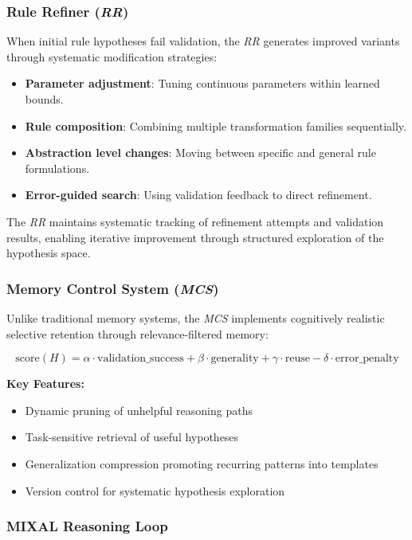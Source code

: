 \documentclass[12pt]{article}
\newcommand{\mcs}{\textit{MCS}}
\newcommand{\rr}{\textit{RR}}
\begin{document}
\subsubsection{Rule Refiner (\rr{})}

When initial rule hypotheses fail validation, the \rr{} generates improved variants through systematic modification strategies:
\begin{itemize}[noitemsep,topsep=0pt]
\item\textbf{Parameter adjustment}: Tuning continuous parameters within learned bounds.
\item\textbf{Rule composition}: Combining multiple transformation families sequentially.
\item\textbf{Abstraction level changes}: Moving between specific and general rule formulations.
\item\textbf{Error-guided search}: Using validation feedback to direct refinement.
\end{itemize}

The \rr{} maintains systematic tracking of refinement attempts and validation results, enabling iterative improvement through structured exploration of the hypothesis space.

\subsubsection{Memory Control System (\mcs{})}

Unlike traditional memory systems, the \mcs{} implements cognitively realistic selective retention through relevance-filtered memory:

$$\text{score}(H) = \alpha \cdot \text{validation\_success} + \beta \cdot \text{generality} + \gamma \cdot \text{reuse} - \delta \cdot \text{error\_penalty}$$

\textbf{Key Features:}
\begin{itemize}[noitemsep,topsep=0pt]
\item Dynamic pruning of unhelpful reasoning paths
\item Task-sensitive retrieval of useful hypotheses
\item Generalization compression promoting recurring patterns into templates
\item Version control for systematic hypothesis exploration
\end{itemize}

\subsubsection{MIXAL Reasoning Loop}
\end{document}
